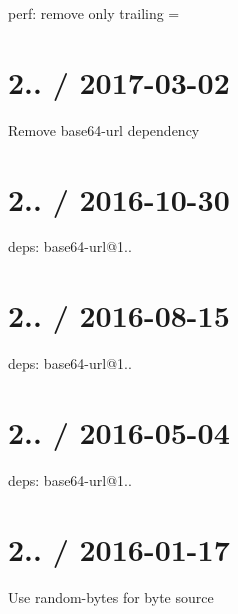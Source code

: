 
\begin{DoxyItemize}
\item perf\+: remove only trailing {\ttfamily =}
\end{DoxyItemize}

\section*{2.. / 2017-\/03-\/02 }


\begin{DoxyItemize}
\item Remove {\ttfamily base64-\/url} dependency
\end{DoxyItemize}

\section*{2.. / 2016-\/10-\/30 }


\begin{DoxyItemize}
\item deps\+: base64-\/url@1..
\end{DoxyItemize}

\section*{2.. / 2016-\/08-\/15 }


\begin{DoxyItemize}
\item deps\+: base64-\/url@1..
\end{DoxyItemize}

\section*{2.. / 2016-\/05-\/04 }


\begin{DoxyItemize}
\item deps\+: base64-\/url@1..
\end{DoxyItemize}

\section*{2.. / 2016-\/01-\/17 }


\begin{DoxyItemize}
\item Use {\ttfamily random-\/bytes} for byte source
\end{DoxyItemize}

